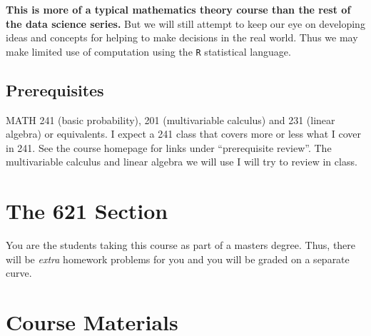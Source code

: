 \documentclass[12pt]{article}
\newcommand{\qu}[1]{``#1''}
\begin{document}

\textbf{This is more of a typical mathematics theory course than the rest of the data science series.} But we will still attempt to keep our eye on developing ideas and concepts for helping to make decisions in the real world. Thus we may make limited use of computation using the \texttt{R} statistical language.

\subsection*{Prerequisites}

MATH 241 (basic probability), 201 (multivariable calculus) and 231 (linear algebra) or equivalents. I expect a 241 class that covers more or less what I cover in 241. See the course homepage for links under \qu{prerequisite review}. The multivariable calculus and linear algebra we will use I will try to review in class.

\section*{The 621 Section}

You are the students taking this course as part of a masters degree. Thus, there will be \textit{extra} homework problems for you and you will be graded on a separate curve.

\section*{Course Materials}
\end{document}
